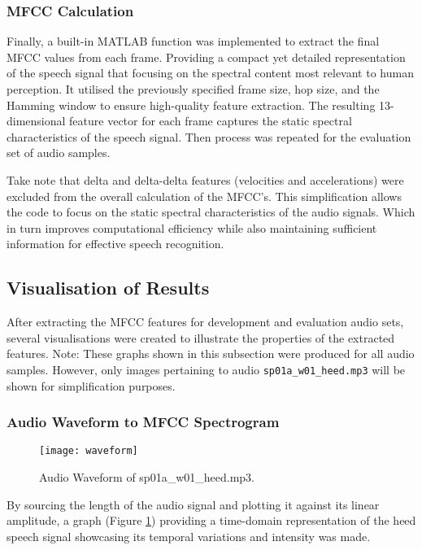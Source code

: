 \documentclass{article}
\begin{document}
\subsubsection{MFCC Calculation}

Finally, a built-in MATLAB function was implemented to extract the final MFCC values from each frame. Providing a compact yet detailed representation of the speech signal that focusing on the spectral content most relevant to human perception. It utilised the previously specified frame size, hop size, and the Hamming window to ensure high-quality feature extraction. The resulting 13-dimensional feature vector for each frame captures the static spectral characteristics of the speech signal. Then process was repeated for the evaluation set of audio samples.

Take note that delta and delta-delta features (velocities and accelerations) were excluded from the overall calculation of the MFCC’s. This simplification allows the code to focus on the static spectral characteristics of the audio signals. Which in turn improves computational efficiency while also maintaining sufficient information for effective speech recognition.

\subsection{Visualisation of Results}

After extracting the MFCC features for development and evaluation audio sets, several visualisations were created to illustrate the properties of the extracted features. Note: These graphs shown in this subsection were produced for all audio samples. However, only images pertaining to audio \verb+sp01a_w01_heed.mp3+ will be shown for simplification purposes.

\subsubsection{Audio Waveform to MFCC Spectrogram}

\begin{figure}[!h]
\begin{center}
\texttt{[image: waveform]}
\end{center}
\caption{\label{fig:waveform} Audio Waveform of sp01a\_w01\_heed.mp3.}
\end{figure}

By sourcing the length of the audio signal and plotting it against its linear amplitude,  a graph (Figure \ref{fig:waveform}) providing a time-domain representation of the heed speech signal showcasing its temporal variations and intensity was made.
\end{document}
